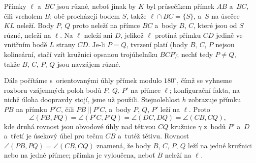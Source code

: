 {    Přímky $\ell$ a~$BC$ jsou různé, neboť jinak by $K$ byl průsečíkem přímek $AB$ a~$BC$, čili vrcholem $B$; obě procházejí bodem $S$, takže $\ell \cap BC = \{S\}$, a~$S$ na úsečce $KL$ neleží. Body $P$, $Q$ proto neleží na přímce $BC$ a~body $B$, $C$, které jsou od $S$ různé, neleží na $\ell$. Na $\ell$ neleží ani $D$, jelikož $\ell$ protíná přímku $CD$ jedině ve vnitřním bodě $L$ strany $CD$. Je-li $P = Q$, tvrzení platí (body $B$, $C$, $P$ nejsou kolineární, stačí vzít kružnici opsanou trojúhelníku $BCP$); nechť tedy $P \neq Q$, takže $B$, $C$, $P$, $Q$ jsou navzájem různé.

    Dále počítáme s~orientovanými úhly přímek modulo $180^\circ$, čímž se vyhneme rozboru vzájemných poloh bodů $P$, $Q$, $P'$ na přímce $\ell$; konfigurační fakta, na nichž úloha doopravdy stojí, jsme už použili. Stejnolehlost $h$ zobrazuje přímku $PB$ na přímku $P'C$, čili $PB \parallel P'C$, a~body $P$, $Q$, $P'$ leží na $\ell$. Proto
    $$
    \angle(PB, PQ) = \angle(P'C, P'Q) = \angle(DC, DQ) = \angle(CB, CQ),
    $$
    kde druhá rovnost jsou obvodové úhly nad tětivou $CQ$ kružnice $\gamma$ z~bodů $P'$ a~$D$ a~třetí je úsekový úhel pro tečnu $CB$ a~tutéž tětivu. Rovnost $\angle(PB,PQ) = \angle(CB,CQ)$ znamená, že body $B$, $C$, $P$, $Q$ leží na jedné kružnici nebo na jedné přímce; přímka je vyloučena, neboť $B$ neleží na $\ell$.
}

